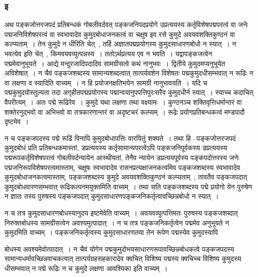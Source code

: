 			\subsubsection{इ}
			
				\begin{small}
					
					अथ पङ्कजोत्तरजपदं प्रतिबन्धकं गोबलीवर्दवत् पङ्कजनिपदप्रयोगे उप्रत्ययस्य कर्तृविशेषपद्मपरत्वं वा जनेः पद्मजनिविशेषपरत्वं वा स्वभावादेव कुमुदबोधाजनकत्वं वा चक्षुष इव रसे कुमुदे अवयवशक्तिकुण्ठनं वा कल्प्यताम्~। तेन कुमुदे न धीरिति चेत्~, तर्हि अज्ञातपद्मप्रयोगस्य कुमुदसाधारणबोधो न स्यात्~। न भवत्येव इति चेत्~, किमवयवव्युत्पन्नस्य~। ततोऽर्थप्रत्यय एव न भवति~। यद्वापङ्कजत्वेन पद्ममेवानुभूयते~। आद्ये मन्दुरजादिपदादिव सामग्रीसत्वे कथं नानुभवः~। द्वितीये कुमुदमप्यनुभूयेत अविशेषात्~। न चैवं पङ्कजशब्दस्य  सामान्यशब्दत्वात् तात्पर्यवशेन विशेषतः पद्मकुमुदधीसम्भवात् न रूढिः न वा लक्षणा व स्यादिति वाच्यम्~। न हि प्रयोजनक्षतिभयेन सामग्री नानुभावयति~। यदि च पद्मकुमुदयोस्तुल्यता तदा अगृहीतपद्मप्रयोगस्य पद्मान्वयानुपपत्तिपुरःसरैव कुमुदधीर्न स्यात्~। स्याच्च कदाचित् वैपरीत्यम्~। अतः पद्मे रूढिरेव~। कुमुदे यथा लक्षणा तथा वक्ष्यामः~। कुण्ठनञ्च शक्तिवृत्तिधर्मान्तरं वा शक्तेरनुद्भवो वा अभिभवो वा तत्रकारणान्तरं वा अदृष्टचरं कल्प्यम्~। रूढेः प्रयोगप्रतिबन्धकत्वं मण्डपादौ दृष्टमेव~। 
				\end{small}
			
				न च पङ्कजपदस्य पद्मे रूढिं विनापि कुमुदबोधापत्तिः वारयितुं शक्यते~। तथा हि –पङ्कजोत्तरजपदं कुमुदबोधं प्रति प्रतिबन्धकमास्तां, डप्रत्ययस्य कर्तृसामान्यपरत्वेऽपि पङ्कजनिपूर्वकस्य  डप्रत्ययस्य  पद्मरूपकर्तृविशेषपरत्वं गोबलीवर्दन्यायेन आस्थीयतां, तेनैव न्यायेन  डप्रत्ययपूर्वस्य पङ्कपदोत्तरस्य जनेः पद्मजनिरूपविशेषपरत्वमास्ताम्, चक्षुषः स्वभावादेव रासनप्रत्यक्षाजनकत्वमिव  पङ्कजशब्दस्य स्वभावादेव कुमुदबोधाजनकत्वमास्ताम्, पङ्कजशब्दस्य कुमुदे अवयवशक्तिकुण्ठनं कल्प्यताम्~, तावतैव पङ्कजपदात्  कुमुदबोधवारणसम्भवात्  रूढिकल्पनमयुक्तमिति वाच्यम्~। तथा सति पङ्कजशब्दस्य  पद्मे प्रयोगो येन पुरुषेण  न ज्ञातः तस्य पुरुषस्य पङ्कजपदात् कुमुदसाधारणपङ्कजनिकर्तृत्वावच्छिन्नबोधो न स्यात्~।
 
				न च तत्र कुमुदसाधारणबोधस्यानुदय  इष्टमेवेति वाच्यम्~। अवयवव्युत्पत्तिमतः  पुरुषस्य पङ्कजशब्दात् निरुक्तबोधस्य सामग्रीसत्वेन अवश्यमुत्पादात्~। न च तत्र पङ्कजनिकर्तृत्वेन पद्ममेव अनुभूयते  न कुमुदमिति वाच्यम्~। पङ्कजनिकर्तृत्वस्य कुमुदसाधारणतया तेन रूपेण पद्मस्येव कुमुदस्यापि
	
				बोधस्य अवश्यमेवोत्पादात्~। न चैवं योगेन पद्मकुमुदोभयसाधारणरूपावच्छिन्नबोधकत्वे पङ्कजपदस्य सामान्यधर्मावच्छिन्नवाचकत्वात् तात्पर्यग्रहसहकारादेव क्वचित् विशिष्य पद्मस्य क्वचिच्च विशिष्य कुमुदस्य धीसम्भवात् न पद्मे रूढिः न च कुमुदे लक्षणा आवश्यिका इति वाच्यम्~। 

